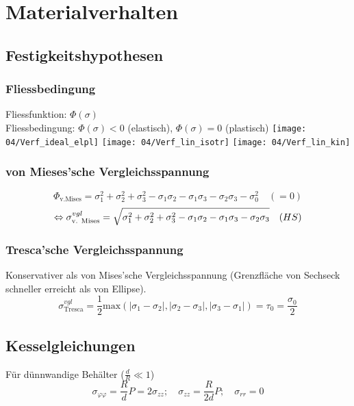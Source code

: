 \section{Materialverhalten}{}
    \subsection{Festigkeitshypothesen}
        \subsubsection{Fliessbedingung}
            Fliessfunktion: $\Phi(\sigma)$\\
            Fliessbedingung: $\Phi(\sigma)<0$ (elastisch), $\Phi(\sigma)=0$ (plastisch)
            \texttt{[image: 04/Verf\_ideal\_elpl]}
            \texttt{[image: 04/Verf\_lin\_isotr]}
            \texttt{[image: 04/Verf\_lin\_kin]}
            
        \subsubsection{von Mieses'sche Vergleichsspannung}
            \[\Phi_{\textrm{v.Mises}}= \sigma_1^2+\sigma_2^2+\sigma_3^2-\sigma_1\sigma_2-\sigma_1\sigma_3-\sigma_2\sigma_3 -\sigma_0^2\quad(=0)\]
            \[\Leftrightarrow \sigma_{\textrm{v. Mises}}^{vgl}= \sqrt{\sigma_1^2+\sigma_2^2+\sigma_3^2-\sigma_1\sigma_2-\sigma_1\sigma_3-\sigma_2\sigma_3} \quad\textrm(HS)\]
            
        \subsubsection{Tresca'sche Vergleichsspannung}
            Konservativer als von Mises'sche Vergleichsspannung (Grenzfläche von Sechseck schneller erreicht als von Ellipse).
            \[\sigma_{\textrm{Tresca}}^{vgl}=\frac{1}{2}\textrm{max} \left(|\sigma_1-\sigma_2|,|\sigma_2-\sigma_3|,|\sigma_3-\sigma_1| \right) =\tau_0=\frac{\sigma_0}{2}\]
        
        \subsection{Kesselgleichungen}
            Für dünnwandige Behälter ($\frac{d}{R} \ll 1$)
            \[\sigma_{\varphi\varphi} = \frac{R}{d}P = 2\sigma_{zz}; \quad \sigma_{zz} = \frac{R}{2d}P; \quad \sigma_{rr}=0\]
            
